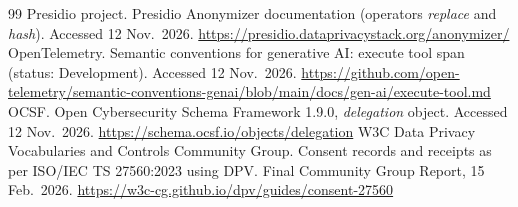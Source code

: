 \documentclass[11pt]{article}
\begin{document}
\begin{thebibliography}{99}
 Presidio project. Presidio Anonymizer documentation (operators \emph{replace} and \emph{hash}). Accessed 12 Nov.\ 2026. \url{https://presidio.dataprivacystack.org/anonymizer/}
 OpenTelemetry. Semantic conventions for generative AI: execute tool span (status: Development). Accessed 12 Nov.\ 2026. \url{https://github.com/open-telemetry/semantic-conventions-genai/blob/main/docs/gen-ai/execute-tool.md}
 OCSF. Open Cybersecurity Schema Framework 1.9.0, \emph{delegation} object. Accessed 12 Nov.\ 2026. \url{https://schema.ocsf.io/objects/delegation}
 W3C Data Privacy Vocabularies and Controls Community Group. Consent records and receipts as per ISO/IEC TS 27560:2023 using DPV. Final Community Group Report, 15 Feb.\ 2026. \url{https://w3c-cg.github.io/dpv/guides/consent-27560}
\end{thebibliography}
\end{document}
